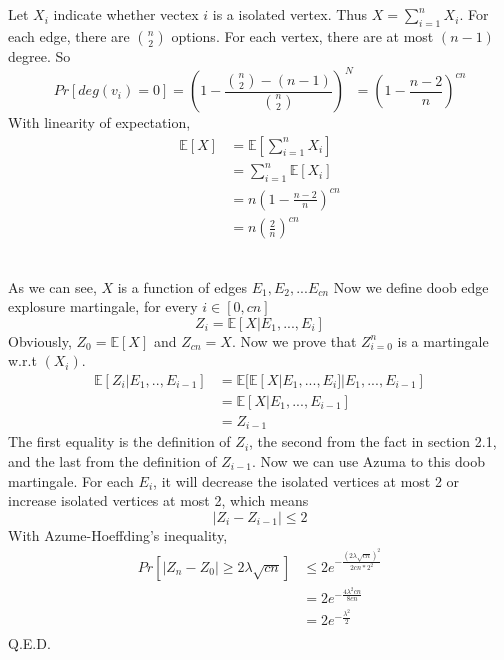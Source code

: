 \documentclass{article}
\begin{document}
	\section{}
	\subsection{}
	Let $X_i$ indicate whether vectex $i$ is a isolated vertex. Thus $X=\sum_{i=1}^nX_i$. For each edge, there are $\binom{n}{2}$ options. For each vertex, there are at most $(n-1)$ degree. So
	$$
	Pr[deg(v_i)=0]=(1-\frac{\binom{n}{2}-(n-1)}{\binom{n}{2}})^N=(1-\frac{n-2}{n})^{cn}
	$$
	With linearity of expectation,
	$$
	\begin{aligned}
	\mathbb{E}[X] &= \mathbb{E}[\sum_{i=1}^{n}X_i]\\
	& = \sum_{i=1}^{n}\mathbb{E}[X_i]\\
	& = n (1-\frac{n-2}{n})^{cn}\\
	& = n(\frac{2}{n})^{cn}\\
	\end{aligned}
	$$

	\subsection{}
	As we can see, $X$ is a function of edges $E_1,E_2,...E_{cn}$
	Now we define doob edge explosure martingale, for every $i \in [0,cn]$
	$$
	Z_i=\mathbb{E}[X|E_1,...,E_i]
	$$
	Obviously, $Z_0=\mathbb{E}[X]$ and $Z_{cn}=X$.
	Now we prove that ${Z}_{i=0}^n$ is a martingale w.r.t $(X_i)$.
	$$
	\begin{aligned}
	\mathbb{E}[Z_i|E_1,..,E_{i-1}] &= \mathbb{E}[\mathbb{E}[X|E_1,...,E_i]|E_1,...,E_{i-1}]\\
	&= \mathbb{E}[X|E_1,...,E_{i-1}]\\
	&= Z_{i-1}
	\end{aligned}
	$$
	The first equality is the definition of $Z_i$, the second from the fact in section 2.1, and the last from the definition of $Z_{i-1}$. Now we can use Azuma to this doob martingale.
	For each $E_i$, it will decrease the isolated vertices at most 2 or increase isolated vertices at most 2, which means
	$$
	|Z_{i}-Z_{i-1}| \leq 2
	$$
	With Azume-Hoeffding's inequality,
	$$
	\begin{aligned}
	Pr[|Z_n-Z_0|\geq 2\lambda\sqrt{cn}] &\leq 2e^{-\frac{(2\lambda\sqrt{cn})^2}{2cn * 2^2}}\\
	&= 2e^{-\frac{4\lambda^2cn}{8cn}}\\
	&= 2e^{-\frac{\lambda^2}{2}}\\
	\end{aligned}
	$$
	Q.E.D.
\end{document}
